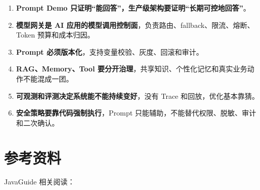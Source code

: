 \documentclass[9pt,a4paper,twocolumn]{ctexart}
\begin{document}
\begin{enumerate}[itemsep=1pt, topsep=2pt]
  \item \textbf{Prompt Demo 只证明“能回答”，生产级架构要证明“长期可控地回答”}。
  \item \textbf{模型网关是 AI 应用的模型调用控制面}，负责路由、fallback、限流、熔断、Token 预算和成本归因。
  \item \textbf{Prompt 必须版本化}，支持变量校验、灰度、回滚和审计。
  \item \textbf{RAG、Memory、Tool 要分开治理}，共享知识、个性化记忆和真实业务动作不能混成一团。
  \item \textbf{可观测和评测决定系统能不能持续变好}，没有 Trace 和回放，优化基本靠猜。
  \item \textbf{安全策略要靠代码强制执行}，Prompt 只能辅助，不能替代权限、脱敏、审计和二次确认。
\end{enumerate}


\section*{参考资料}


JavaGuide 相关阅读：
\end{document}
